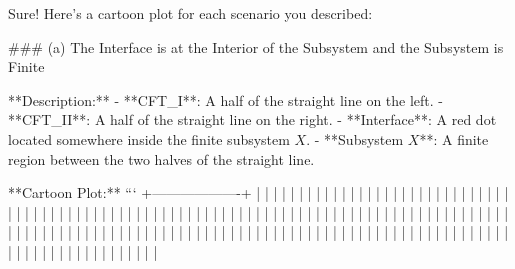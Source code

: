 Sure! Here's a cartoon plot for each scenario you described:

### (a) The Interface is at the Interior of the Subsystem and the Subsystem is Finite

**Description:**
- **CFT_I**: A half of the straight line on the left.
- **CFT_II**: A half of the straight line on the right.
- **Interface**: A red dot located somewhere inside the finite subsystem \( X \).
- **Subsystem \( X \)**: A finite region between the two halves of the straight line.

**Cartoon Plot:**
```
  +-------------------+
  |                   |
  |                   |
  |                   |
  |                   |
  |                   |
  |                   |
  |                   |
  |                   |
  |                   |
  |                   |
  |                   |
  |                   |
  |                   |
  |                   |
  |                   |
  |                   |
  |                   |
  |                   |
  |                   |
  |                   |
  |                   |
  |                   |
  |                   |
  |                   |
  |                   |
  |                   |
  |                   |
  |                   |
  |                   |
  |                   |
  |                   |
  |                   |
  |                   |
  |                   |
  |                   |
  |                   |
  |                   |
  |                   |
  |                   |
  |                   |
  |                   |
  |                   |
  |                   |
  |                   |
  |                   |
  |                   |
  |                   |
  |                   |
  |                   |
  |                   |
  |                   |
  |                   |
  |                   |
  |                   |
  |                   |
  |                   |
  |                   |
  |                   |
  |                   |
  |                   |
  |                   |
  |                   |
  |                   |
  |                   |
  |                   |
  |                   |
  |                   |
  |                   |
  |                   |
  |                   |
  |                   |
  |                   |
  |                   |
  |                   |
  |                   |
  |                   |
  |                   |
  |                   |
  |                   |
  |                   |
  |                   |
  |                   |
  |                   |
